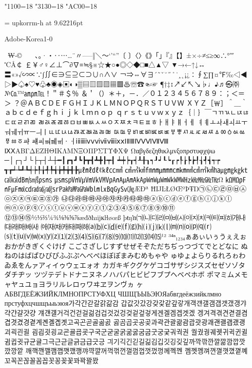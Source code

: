 %
%
%
%
\kcatcode"1100=18%
\kcatcode"3130=18%
\kcatcode"AC00=18%

\font\upkorrm = upkorrm-h at 9.62216pt
\upkorrm


Adobe-Korea1-0

 ₩‐©ㅤ　、。·・‥⋯…¨〃–—‖＼～‘’“”〔
〕〈〉《》「」『』【】±×÷≠≤≥∞∴°′″℃Å￠
￡￥♂♀∠⊥⌒∂∇≡≒§※☆★○●◎◇◆□■△▲▽
▼→←↑↓↔〓«»√∽∝∵∫∬∈∋⊆⊇⊂⊃∪∩∧∨
￢⇒⇔∀∃´˜ˇ˘˝˚˙¸˛¡¿∶∮∑∏¤℉‰◁◀
▷▶♤♠♡♥♧♣◉◈▣◐◑▒▤▥▨▧▦▩♨☏☎☜☞
¶†‡↕↗↙↖↘♭♩♪♬㉿㈜№㏇™㏂㏘℡！＂＃＄％
＆＇（）＊＋，－．／０１２３４５６７８９：；＜＝＞
？＠ＡＢＣＤＥＦＧＨＩＪＫＬＭＮＯＰＱＲＳＴＵＶＷ
ＸＹＺ［￦］＾＿｀ａｂｃｄｅｆｇｈｉｊｋｌｍｎｏｐ
ｑｒｓｔｕｖｗｘｙｚ｛｜｝￣ㄱㄲㄳㄴㄵㄶㄷㄸㄹㄺㄻ
ㄼㄽㄾㄿㅀㅁㅂㅃㅄㅅㅆㅇㅈㅉㅊㅋㅌㅍㅎㅏㅐㅑㅒㅓㅔ
ㅕㅖㅗㅘㅙㅚㅛㅜㅝㅞㅟㅠㅡㅢㅣㅥㅦㅧㅨㅩㅪㅫㅬㅭㅮ
ㅯㅰㅱㅲㅳㅴㅵㅶㅷㅸㅹㅺㅻㅼㅽㅾㅿㆀㆁㆂㆃㆄㆅㆆㆇ
ㆈㆉㆊㆋㆌㆍㆎⅰⅱⅲⅳⅴⅵⅶⅷⅸⅹⅠⅡⅢⅣⅤⅥⅦⅧ
ⅨⅩΑΒΓΔΕΖΗΘΙΚΛΜΝΞΟΠΡΣΤΥΦΧΨ
Ωαβγδεζηθικλμνξοπρστυφχψω
─│┌┐┘└├┬┤┴┼━┃┏┓┛┗┣┳┫┻╋┠┯┨
┷┿┝┰┥┸╂┒┑┚┙┖┕┎┍┞┟┡┢┦┧┩┪┭┮
┱┲┵┶┹┺┽┾╀╁╃╄╅╆╇╈╉╊㎕㎖㎗ℓ㎘㏄㎣
㎤㎥㎦㎙㎚㎛㎜㎝㎞㎟㎠㎡㎢㏊㎍㎎㎏㏏㎈㎉㏈㎧㎨㎰㎱
㎲㎳㎴㎵㎶㎷㎸㎹㎀㎁㎂㎃㎄㎺㎻㎼㎽㎾㎿㎐㎑㎒㎓㎔Ω
㏀㏁㎊㎋㎌㏖㏅㎭㎮㎯㏛㎩㎪㎫㎬㏝㏐㏓㏃㏉㏜㏆ÆÐª
ĦĲĿŁØŒºÞŦŊ㉠㉡㉢㉣㉤㉥㉦㉧㉨㉩㉪㉫㉬㉭㉮
㉯㉰㉱㉲㉳㉴㉵㉶㉷㉸㉹㉺㉻ⓐⓑⓒⓓⓔⓕⓖⓗⓘⓙⓚⓛ
ⓜⓝⓞⓟⓠⓡⓢⓣⓤⓥⓦⓧⓨⓩ①②③④⑤⑥⑦⑧⑨⑩⑪
⑫⑬⑭⑮½⅓⅔¼¾⅛⅜⅝⅞æđðħıĳĸŀłøœß
þŧŋŉ㈀㈁㈂㈃㈄㈅㈆㈇㈈㈉㈊㈋㈌㈍㈎㈏㈐㈑㈒㈓㈔
㈕㈖㈗㈘㈙㈚㈛⒜⒝⒞⒟⒠⒡⒢⒣⒤⒥⒦⒧⒨⒩⒪⒫⒬⒭
⒮⒯⒰⒱⒲⒳⒴⒵⑴⑵⑶⑷⑸⑹⑺⑻⑼⑽⑾⑿⒀⒁⒂¹²
³⁴ⁿ₁₂₃₄ぁあぃいぅうぇえぉおかがきぎくぐけげ
こごさざしじすずせぜそぞただちぢっつづてでとどなに
ぬねのはばぱひびぴふぶぷへべぺほぼぽまみむめもゃや
ゅゆょよらりるれろゎわゐゑをんァアィイゥウェエォオ
カガキギクグケゲコゴサザシジスズセゼソゾタダチヂッ
ツヅテデトドナニヌネノハバパヒビピフブプヘベペホボ
ポマミムメモャヤュユョヨラリルレロヮワヰヱヲンヴヵ
ヶАБВГДЕЁЖЗИЙКЛМНОПРСТУФХЦ
ЧШЩЪЫЬЭЮЯабвгдеёжзийклмно
прстуфхцчшщъыьэюя가각간갇갈갉갊감
갑값갓갔강갖갗같갚갛개객갠갤갬갭갯갰갱갸갹갼걀걋걍
걔걘걜거걱건걷걸걺검겁것겄겅겆겉겊겋게겐겔겜겝겟겠
겡겨격겪견겯결겸겹겻겼경곁계곈곌곕곗고곡곤곧골곪곬
곯곰곱곳공곶과곽관괄괆괌괍괏광괘괜괠괩괬괭괴괵괸괼
굄굅굇굉교굔굘굡굣구국군굳굴굵굶굻굼굽굿궁궂궈궉권
궐궜궝궤궷귀귁귄귈귐귑귓규균귤그극근귿글긁금급긋긍
긔기긱긴긷길긺김깁깃깅깆깊까깍깎깐깔깖깜깝깟깠깡깥
깨깩깬깰깸깹깻깼깽꺄꺅꺌꺼꺽꺾껀껄껌껍껏껐껑께껙껜
껨껫껭껴껸껼꼇꼈꼍꼐꼬꼭꼰꼲꼴꼼꼽꼿꽁꽂꽃꽈꽉꽐꽜

